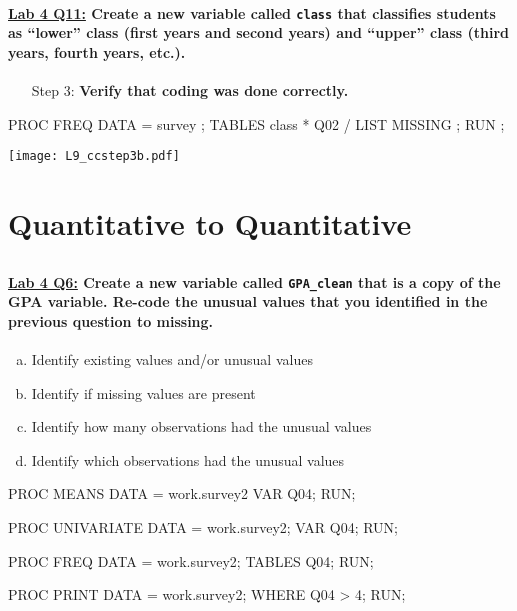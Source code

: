 \begin{frame}[fragile]
\framesubtitle{\underline{Lab 4 Q11:} Create a new variable called \texttt{class} that classifies students as ``lower'' class (first years and second years) and ``upper'' class (third years, fourth years, etc.).}
\begin{itemize}
\item[Step 3:] \textbf{Verify that coding was done correctly.}
\end{itemize}
\vskip10pt
\footnotesize
\begin{code}{.0}
PROC FREQ DATA =  survey ;
   TABLES class * Q02
   / LIST MISSING ;
RUN ;
\end{code}
\emp
{} \hspace{1in} \emp
{}
\texttt{[image: L9\_ccstep3b.pdf]}
\emp
\end{frame}

\section[Quantitative to Quantitative]{Quantitative to Quantitative}
\subsection{}
\begin{frame}
\end{frame}

\begin{frame}[fragile]
\framesubtitle{\underline{Lab 4 Q6:} Create a new variable called \texttt{GPA\_clean} that is a copy of the GPA variable.  Re-code the unusual values that you identified in the previous question to missing. }
\begin{enumerate}[a.]
\item Identify existing values and/or unusual values
\item Identify if missing values are present
\item Identify how many observations had the unusual values
\item Identify which observations had the unusual values
\end{enumerate}
\vskip10pt
\footnotesize
\begin{code}{.0}
PROC MEANS DATA = work.survey2 VAR  Q04; RUN;

PROC UNIVARIATE DATA = work.survey2; VAR Q04; RUN;

PROC FREQ DATA = work.survey2; TABLES Q04; RUN;

PROC PRINT DATA = work.survey2; WHERE Q04 > 4; RUN;
\end{code}
\emp
\end{frame}



